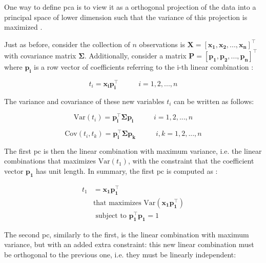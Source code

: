 One way to define \acrfull{pca} is to view it as a orthogonal projection of the data into a principal space of lower dimension such that the variance of this projection is maximized \parencite{bishop2006pattern}.

Just as before, consider the  collection of $n$ observations is $\mathbf{X = [x_1, x_2, ..., x_n]^\intercal}$ with covariance matrix $\mathbf{\Sigma}$. Additionally, consider a matrix $\mathbf{P = [p_1, p_2, ..., p_n]^\intercal}$ where $\mathbf{p_i}$ is a row vector of coefficients referring to the i-th linear combination \parencite{johnson2013applied}:

\begin{equation}
	\label{eqn:pca-lincomb}
	t_i=\mathbf{x_i p_i^\intercal} \;\;\;\;\;\;\;\;\;\; i = 1, 2, ..., n
\end{equation}

The variance and covariance of these new variables $t_i$ can be written as follows:

\begin{equation}
	\label{eqn:pca-var}
	\text{Var}(t_i) = \mathbf{p_i^\intercal \Sigma p_i} \;\;\;\;\;\;\;\;\;\; i = 1, 2, ..., n
\end{equation}

\begin{equation}
	\label{eqn:pca-cov}
	\text{Cov}(t_i, t_k) = \mathbf{p_i^\intercal \Sigma p_k}\;\;\;\;\;\;\;\;\;\; i,k= 1, 2, ..., n
\end{equation}

The first \acrfull{pc} is then the linear combination with maximum variance, i.e. the linear combinations that maximizes $\text{Var}(t_1)$, with the constraint that the coefficient vector $\mathbf{p_1}$ has unit length. In summary, the first \acrshort{pc} is computed as \parencite{johnson2013applied}:

\begin{equation}
	\label{eqn:pca-pc1}
	\begin{split}
		t_1 & =\mathbf{x_1 p_1^\intercal} \\
			   & \text{that maximizes Var}(\mathbf{x_1 p_1^\intercal}) \\
			   & \text{ subject to }  \mathbf{p_1^\intercal p_1} = 1
	\end{split}
\end{equation}

The second \acrshort{pc}, similarly to the first, is the linear combination with maximum variance, but with an added extra constraint: this new linear combination must be orthogonal to the previous one, i.e. they must be linearly independent:

